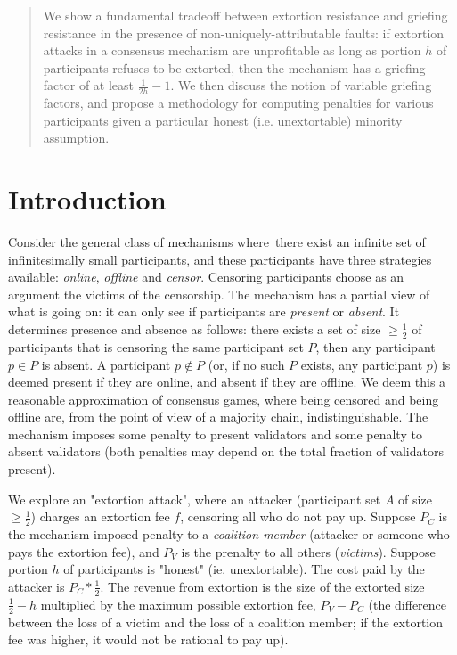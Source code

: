 \documentclass[12pt]{article}
\begin{document}
\maketitle
\begin{abstract}
We show a fundamental tradeoff between extortion resistance and griefing resistance in the presence of non-uniquely-attributable faults: if extortion attacks in a consensus mechanism are unprofitable as long as portion $h$ of participants refuses to be extorted, then the mechanism has a griefing factor of at least $\frac{1}{2h} - 1$. We then discuss the notion of variable griefing factors, and propose a methodology for computing penalties for various participants given a particular honest (i.e. unextortable) minority assumption.
\end{abstract}

\section{Introduction}
Consider the general class of mechanisms where there exist an infinite set of infinitesimally small participants, and these participants have three strategies available: \textit{online}, \textit{offline} and \textit{censor}. Censoring participants choose as an argument the victims of the censorship. The mechanism has a partial view of what is going on: it can only see if participants are \textit{present} or \textit{absent}. It determines presence and absence as follows: there exists a set of size $\ge \frac{1}{2}$ of participants that is censoring the same participant set $P$, then any participant $p \in P$ is absent. A participant $p \not \in P$ (or, if no such $P$ exists, any participant $p$) is deemed present if they are online, and absent if they are offline. We deem this a reasonable approximation of consensus games, where being censored and being offline are, from the point of view of a majority chain, indistinguishable. The mechanism imposes some penalty to present validators and some penalty to absent validators (both penalties may depend on the total fraction of validators present).

We explore an "extortion attack", where an attacker (participant set $A$ of size $\ge \frac{1}{2}$) charges an extortion fee $f$, censoring all who do not pay up. Suppose $P_C$ is the mechanism-imposed penalty to a \textit{coalition member} (attacker or someone who pays the extortion fee), and $P_V$ is the prenalty to all others (\textit{victims}). Suppose portion $h$ of participants is "honest" (ie. unextortable). The cost paid by the attacker is $P_C * \frac{1}{2}$. The revenue from extortion is the size of the extorted size $\frac{1}{2} - h$ multiplied by the maximum possible extortion fee, $P_V - P_C$ (the difference between the loss of a victim and the loss of a coalition member; if the extortion fee was higher, it would not be rational to pay up).
\end{document}

